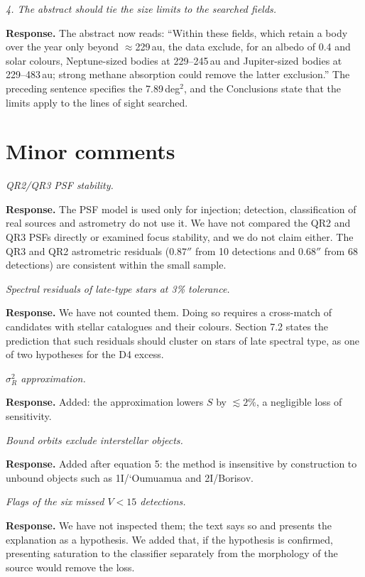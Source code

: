 \documentclass[11pt]{article}
\newenvironment{referee}{\par\color{black!60}\itshape}{\par}
\newcommand{\resp}{\par\noindent\textbf{Response.} }
\begin{document}
\begin{referee}
4. The abstract should tie the size limits to the searched fields.
\end{referee}
\resp The abstract now reads: ``Within these fields, which retain a body over the year only beyond $\approx$229\,au, the data exclude, for an albedo of 0.4 and solar colours, Neptune-sized bodies at 229--245\,au and Jupiter-sized bodies at 229--483\,au; strong methane absorption could remove the latter exclusion.'' The preceding sentence specifies the 7.89\,deg$^2$, and the Conclusions state that the limits apply to the lines of sight searched.

\section*{Minor comments}

\begin{referee}
QR2/QR3 PSF stability.
\end{referee}
\resp The PSF model is used only for injection; detection, classification of real sources and astrometry do not use it. We have not compared the QR2 and QR3 PSFs directly or examined focus stability, and we do not claim either. The QR3 and QR2 astrometric residuals ($0.87''$ from 10 detections and $0.68''$ from 68 detections) are consistent within the small sample.

\begin{referee}
Spectral residuals of late-type stars at 3\% tolerance.
\end{referee}
\resp We have not counted them. Doing so requires a cross-match of candidates with stellar catalogues and their colours. Section 7.2 states the prediction that such residuals should cluster on stars of late spectral type, as one of two hypotheses for the D4 excess.

\begin{referee}
$\sigma_R^2$ approximation.
\end{referee}
\resp Added: the approximation lowers $S$ by $\lesssim 2\%$, a negligible loss of sensitivity.

\begin{referee}
Bound orbits exclude interstellar objects.
\end{referee}
\resp Added after equation 5: the method is insensitive by construction to unbound objects such as 1I/`Oumuamua and 2I/Borisov.

\begin{referee}
Flags of the six missed $V < 15$ detections.
\end{referee}
\resp We have not inspected them; the text says so and presents the explanation as a hypothesis. We added that, if the hypothesis is confirmed, presenting saturation to the classifier separately from the morphology of the source would remove the loss.
\end{document}
